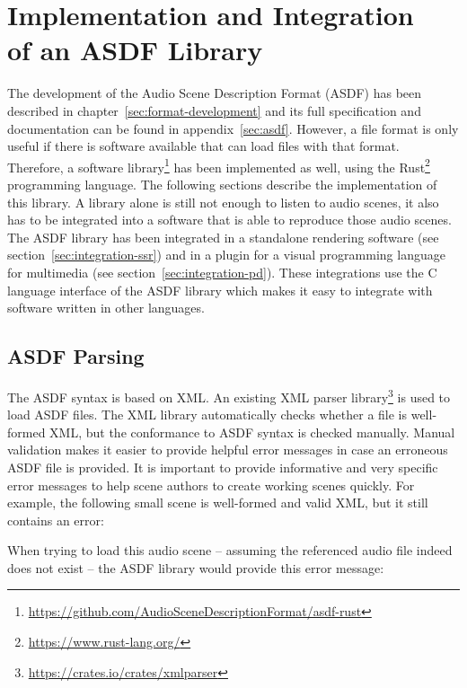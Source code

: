 \chapter[Implementation and Integration of an ASDF Library]
{Implementation and Integration\\of an ASDF Library}
\label{sec:implementation}

The development of the Audio Scene Description Format (ASDF) has been described
in chapter~\ref{sec:format-development}
and its full specification and documentation can be found
in appendix~\ref{sec:asdf}.
However, a file format is only useful if there is software available
that can load files with that format.
Therefore, a software library\footnote{%
\url{https://github.com/AudioSceneDescriptionFormat/asdf-rust}}
has been implemented as well, using the Rust\footnote{%
\url{https://www.rust-lang.org/}} programming language.
The following sections describe the implementation of this library.
A library alone is still not enough to listen to audio scenes,
it also has to be integrated into a software that is able to reproduce
those audio scenes.
The ASDF library has been integrated in a standalone rendering software
(see section~\ref{sec:integration-ssr})
and in a plugin for a visual programming language for multimedia
(see section~\ref{sec:integration-pd}).
These integrations use the C language interface of the ASDF library
which makes it easy to integrate with software written in other languages.


\section{ASDF Parsing}

The ASDF syntax is based on XML.
An existing XML parser library\footnote{%
\url{https://crates.io/crates/xmlparser}}
is used to load ASDF files.
The XML library automatically checks whether a file is well-formed XML,
but the conformance to ASDF syntax is checked manually.
Manual validation makes it easier to provide helpful error messages
in case an erroneous ASDF file is provided.
It is important to provide informative and very specific error messages
to help scene authors to create working scenes quickly.
For example,
the following small scene is well-formed and valid XML,
but it still contains an error:



\noindent
When trying to load this audio scene
-- assuming the referenced audio file indeed does not exist --
the ASDF library would provide this error message:

